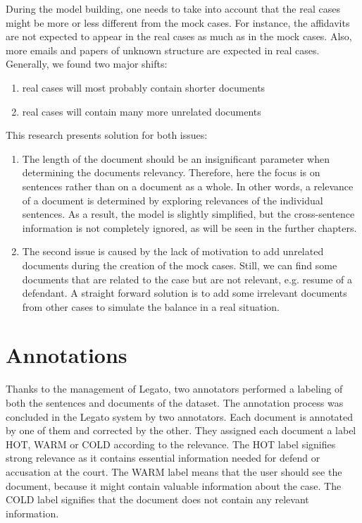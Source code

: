 \documentclass[
  digital, %
  notable,   %
  nolof,     %
  nolot,     %
  draft
]{fithesis3}
\begin{document}
During the model building, one needs to take into account that the real cases might be more or less different from the mock cases.
For instance, the affidavits are not expected to appear in the real cases as much as in the mock cases.
Also, more emails and papers of unknown structure are expected in real cases.
Generally, we found two major shifts: 
\begin{enumerate}
\item real cases will most probably contain shorter documents
\item real cases will contain many more unrelated documents
\end{enumerate}
This research presents solution for both issues:
\begin{enumerate}
\item 
The length of the document should be an insignificant parameter when determining the documents relevancy.
Therefore, here the focus is on sentences rather than on a document as a whole.
In other words, a relevance of a document is determined by exploring relevances of the individual sentences.
As a result, the model is slightly simplified, but the cross-sentence information is not completely ignored, as will be seen in the further chapters.

\item
The second issue is caused by the lack of motivation to add unrelated documents during the creation of the mock cases.
Still, we can find some documents that are related to the case but are not relevant, e.g. resume of a defendant.
A straight forward solution is to add some irrelevant documents from other cases to simulate the balance in a real situation.

\end{enumerate}

\section{Annotations}
Thanks to the management of Legato, two annotators performed a labeling of both the sentences and documents of the dataset.
The annotation process was concluded in the Legato system by two annotators.
Each document is annotated by one of them and corrected by the other.
They assigned each document a label HOT, WARM or COLD according to the relevance.
The HOT label signifies strong relevance as it contains essential information needed for defend or accusation at the court.
The WARM label means that the user should see the document, because it might contain valuable information about the case.
The COLD label signifies that the document does not contain any relevant information.
\end{document}
